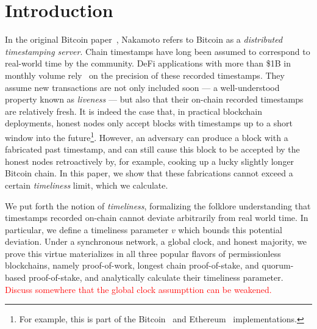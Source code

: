 \section{Introduction}
In the original Bitcoin paper~\cite{bitcoin}, Nakamoto refers to
Bitcoin as a \emph{distributed timestamping server}.
Chain timestamps have long been assumed to correspond to real-world time by the community.
DeFi applications with more than \$1B in monthly volume
rely~\cite{0x-timestamp} on the precision of these recorded timestamps.
They assume new transactions are not only
included soon --- a well-understood property known as \emph{liveness} ---
but also that their on-chain recorded timestamps are relatively fresh.
It is indeed the case that, in practical blockchain deployments, honest nodes only accept
blocks with timestamps up to a short window into the future\footnote{
  For example, this is part of the Bitcoin~\cite{bitcoin-code-future-blocks}
  and Ethereum~\cite{geth-future-blocks} implementations.
}.
However, an adversary can produce a block with a fabricated past timestamp,
and can still cause this block to be accepted by the honest nodes retroactively by, for example, cooking
up a lucky slightly longer Bitcoin chain. In this paper, we show that these fabrications
cannot exceed a certain \emph{timeliness} limit, which we calculate.


We put forth the notion of \emph{timeliness}, formalizing the folklore
understanding that timestamps recorded on-chain cannot deviate arbitrarily
from real world time. In particular, we define a timeliness parameter $v$ which bounds
this potential deviation. Under a synchronous network, a global clock, and honest majority, we prove this virtue materializes in all three popular flavors of
permissionless blockchains, namely proof-of-work,
longest chain proof-of-stake, and quorum-based proof-of-stake, and analytically
calculate their timeliness parameter.
\textcolor{red}{Discuss somewhere that the global clock assumpttion can be weakened.}

